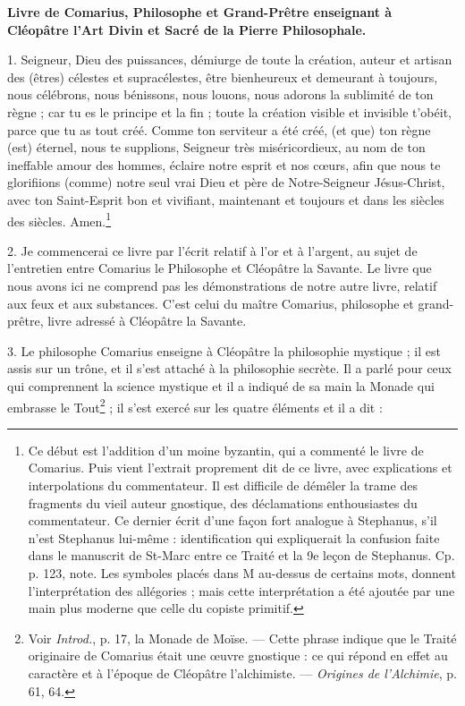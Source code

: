 \documentclass[a4paper, 11pt, oneside, polutonikogreek, french]{article}
\begin{document}
\textbf{Livre de Comarius, Philosophe et Grand-Prêtre enseignant à Cléopâtre l'Art Divin et Sacré de la Pierre Philosophale.}

1. Seigneur, Dieu des puissances, démiurge de toute la création, auteur et artisan des (êtres) célestes et supracélestes, être bienheureux et demeurant à toujours, nous célébrons, nous bénissons, nous louons, nous adorons la sublimité de ton règne ; car tu es le principe et la fin ; toute la création visible et invisible t'obéit, parce que tu as tout créé. Comme ton serviteur a été créé, (et que) ton règne (est) éternel, nous te supplions, Seigneur très miséricordieux, au nom de ton ineffable amour des hommes, éclaire notre esprit et nos cœurs, afin que nous te glorifiions (comme) notre seul vrai Dieu et père de Notre-Seigneur Jésus-Christ, avec ton Saint-Esprit bon et vivifiant, maintenant et toujours et dans les siècles des siècles. Amen.\footnote{Ce début est l'addition d'un moine byzantin, qui a commenté le livre de Comarius. Puis vient l'extrait proprement dit de ce livre, avec explications et interpolations du commentateur. Il est difficile de démêler la trame des fragments du vieil auteur gnostique, des déclamations enthousiastes du commentateur. Ce dernier écrit d'une façon fort analogue à Stephanus, s'il n'est Stephanus lui-même : identification qui expliquerait la confusion faite dans le manuscrit de St-Marc entre ce Traité et la 9e leçon de Stephanus. Cp. p. 123, note. Les symboles placés dans M au-dessus de certains mots, donnent l'interprétation des allégories ; mais cette interprétation a été ajoutée par une main plus moderne que celle du copiste primitif.}

2. Je commencerai ce livre par l'écrit relatif à l'or et à l'argent, au sujet de l'entretien entre Comarius le Philosophe et Cléopâtre la Savante. Le livre que nous avons ici ne comprend pas les démonstrations de notre autre livre, relatif aux feux et aux substances. C'est celui du maître Comarius, philosophe et grand-prêtre, livre adressé à Cléopâtre la Savante.

3. Le philosophe Comarius enseigne à Cléopâtre la philosophie mystique ; il est assis sur un trône, et il s'est attaché à la philosophie secrète. Il a parlé pour ceux qui comprennent la science mystique et il a indiqué de sa main la Monade qui embrasse le Tout\footnote{Voir \emph{Introd.}, p. 17, la Monade de Moïse. --- Cette phrase indique que le Traité originaire de Comarius était une œuvre gnostique : ce qui répond en effet au caractère et à l'époque de Cléopâtre l'alchimiste. --- \emph{Origines de l'Alchimie}, p. 61, 64.} ; il s'est exercé sur les quatre éléments et il a dit :
\end{document}
